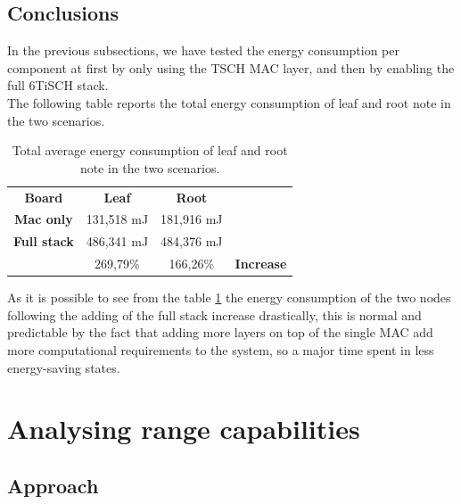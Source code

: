 \documentclass[conference]{IEEEtran}
\begin{document}
\subsection{Conclusions}
In the previous subsections, we have tested the energy consumption per component at first by only using the TSCH MAC layer, and then by enabling the full 6TiSCH stack.\\
The following table reports the total energy consumption of leaf and root note in the two scenarios.
\begin{table}[H]
	\begin{center}
		\begin{tabular}{cccl}
			\cline{1-3}
			\textbf{Board}      & \textbf{Leaf} & \textbf{Root} & \textbf{}         \\ \cline{1-3}
			\textbf{Mac only}   & 131,518 mJ      & 181,916 mJ       &                   \\
			\textbf{Full stack} & 486,341 mJ      & 484,376 mJ      &                   \\ \hline
			\textbf{}           & 269,79\%      & 166,26\%      & \textbf{Increase} \\ \hline
		\end{tabular}
	\end{center}
	\caption{Total average energy consumption of leaf and root note in the two scenarios.}
	\label{tab:scenarios1Table}
\end{table}

As it is possible to see from the table \ref{tab:scenarios1Table} the energy consumption of the two nodes following the adding of the full stack increase drastically, this is normal and predictable by the fact that adding more layers on top of the single MAC add more computational requirements to the system, so a major time spent in less energy-saving states.


\section{Analysing range capabilities}
\label{section:task3}

\subsection{Approach} 
\end{document}
